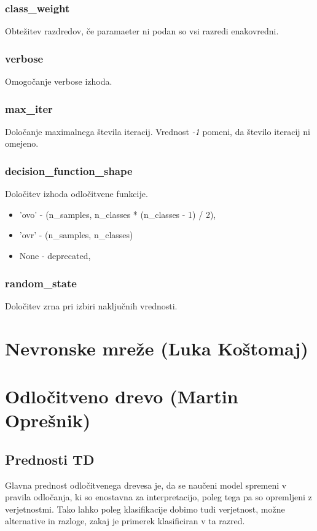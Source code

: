 \documentclass[a4paper,11pt]{article}
\begin{document}
\subsubsection{class_weight}
	Obtežitev razdredov, če paramaeter ni podan so vsi razredi enakovredni.

\subsubsection{verbose}
	Omogočanje verbose izhoda.

\subsubsection{max_iter}
	Določanje maximalnega števila iteracij. Vrednost \textit{-1} pomeni, da število iteracij ni omejeno.

\subsubsection{decision_function_shape}
	Določitev izhoda odločitvene funkcije.
	\begin{itemize}
		\item{'ovo'  - (n_samples, n_classes * (n_classes - 1) / 2),}
		\item{'ovr'  - (n_samples, n_classes) }
		\item{None  - deprecated,}
	\end{itemize}

\subsubsection{random_state}
	Določitev zrna pri izbiri naključnih vrednosti.



\section{Nevronske mreže (Luka Koštomaj)}


 
\section{Odločitveno drevo (Martin Oprešnik) }

\subsection{Prednosti TD}
	Glavna prednost odločitvenega drevesa je, da se naučeni model spremeni v pravila odločanja, ki so enostavna za interpretacijo, poleg tega pa so opremljeni z verjetnostmi. Tako lahko poleg klasifikacije dobimo tudi verjetnost, možne alternative in razloge, zakaj je primerek klasificiran v ta razred.
\end{document}
